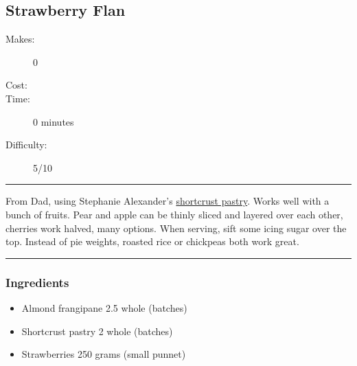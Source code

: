 \documentclass[]{article}
\begin{document}
\subsection*{\center\huge Strawberry Flan}
\begin{description}
\item[Makes:] 0 
\item[Cost:] \textdollar
\item[Time:] 0 minutes
\item[Difficulty:] 5/10
\end{description}
\vspace{0.2cm}\hrule\vspace{0.5cm}
\begin{adjustwidth}{0.5 cm}{0.5 cm}

From Dad, using Stephanie Alexander's \hyperref[rec:Shortcrust Pastry]{shortcrust pastry}. Works well with a bunch of fruits. Pear and apple can be thinly sliced and layered over each other, cherries work halved, many options. When serving, sift some icing sugar over the top. Instead of pie weights, roasted rice or chickpeas both work great.  \hfill{}\color{black}

\end{adjustwidth}
\vspace{0.5cm}\hrule
\subsubsection*{\Large Ingredients}
\begin{multicols}{2}
\begin{itemize}
 \item Almond frangipane \hfill 2.5 whole (batches)
 \item Shortcrust pastry \hfill 2 whole (batches)
 \item Strawberries \hfill 250 grams (small punnet)
\end{itemize}
\end{multicols}
\end{document}
